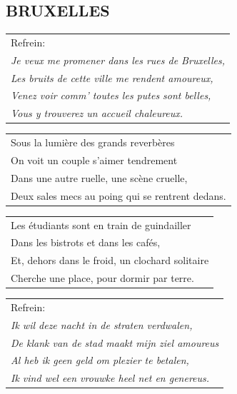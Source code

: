 \documentclass[a4paper, 14pt]{extarticle}
\begin{document}
\subsection*{BRUXELLES}
\begin{flushleft}
\begin{tabularx}{0.8\textwidth} {
   >{\raggedright\arraybackslash}X}
   Refrein:\\
\textit{Je veux me promener dans les rues de Bruxelles,}\\
\textit{Les bruits de cette ville me rendent amoureux,}\\
\textit{Venez voir comm’ toutes les putes sont belles,}\\
\textit{Vous y trouverez un accueil chaleureux.}\\
\end{tabularx}
\end{flushleft}
\begin{flushleft}
\begin{tabularx}{0.8\textwidth} {
   >{\raggedright\arraybackslash}X}
Sous la lumière des grands reverbères\\
On voit un couple s’aimer tendrement\\
Dans une autre ruelle, une scène cruelle,\\
Deux sales mecs au poing qui se rentrent dedans.\\
\end{tabularx}
\end{flushleft}
\begin{flushleft}
\begin{tabularx}{0.8\textwidth} {
   >{\raggedright\arraybackslash}X}
Les étudiants sont en train de guindailler\\
Dans les bistrots et dans les cafés,\\
Et, dehors dans le froid, un clochard solitaire\\
Cherche une place, pour dormir par terre.\\
\end{tabularx}
\end{flushleft}
\begin{flushleft}
\begin{tabularx}{0.8\textwidth} {
   >{\raggedright\arraybackslash}X}
   Refrein:\\
\textit{Ik wil deze nacht in de straten verdwalen,}\\
\textit{De klank van de stad maakt mijn ziel amoureus}\\
\textit{Al heb ik geen geld om plezier te betalen,}\\
\textit{Ik vind wel een vrouwke heel net en genereus.}\\
\end{tabularx}
\end{flushleft}
\end{document}
